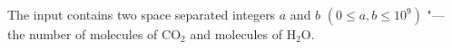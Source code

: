 The input contains two space separated integers $a$ and $b$ $(0\le a,b\le 10^9)$ "--- the number of molecules of $\text{CO}_2$ and molecules of $\text{H}_2\text{O}$.
